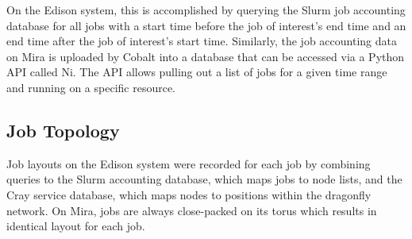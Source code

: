 On the Edison system, this is accomplished by querying the Slurm job accounting database for all jobs with a start time before the job of interest's end time and an end time after the job of interest's start time.
Similarly, the job accounting data on Mira is uploaded by Cobalt into a database that can be accessed via a Python API called Ni.
The API allows pulling out a list of jobs for a given time range and running on a specific resource.

\subsection{Job Topology} \label{sec:methods/other}

%
Job layouts on the Edison system were recorded for each job by combining queries to the Slurm accounting database, which maps jobs to node lists, and the Cray service database, which maps nodes to positions within the dragonfly network.
On Mira, jobs are always close-packed on its torus which results in identical layout for each job.



